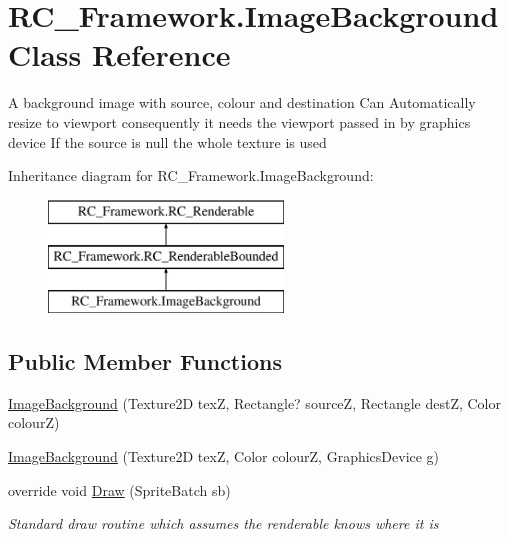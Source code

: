 \hypertarget{class_r_c___framework_1_1_image_background}{}\section{R\+C\+\_\+\+Framework.\+Image\+Background Class Reference}
\label{class_r_c___framework_1_1_image_background}


A background image with source, colour and destination Can Automatically resize to viewport consequently it needs the viewport passed in by graphics device If the source is null the whole texture is used  


Inheritance diagram for R\+C\+\_\+\+Framework.\+Image\+Background\+:\begin{figure}[H]
\begin{center}
\leavevmode
\includegraphics[height=3.000000cm]{class_r_c___framework_1_1_image_background}
\end{center}
\end{figure}
\subsection*{Public Member Functions}
\begin{DoxyCompactItemize}
\item 
\mbox{\hyperlink{class_r_c___framework_1_1_image_background_ad66973504fc9518e98e0757458973880}{Image\+Background}} (Texture2D texZ, Rectangle? sourceZ, Rectangle destZ, Color colourZ)
\item 
\mbox{\hyperlink{class_r_c___framework_1_1_image_background_a64185561061a54b6241c982541ed54a7}{Image\+Background}} (Texture2D texZ, Color colourZ, Graphics\+Device g)
\item 
override void \mbox{\hyperlink{class_r_c___framework_1_1_image_background_a1aaef38a9b320b21dc558e25d5a4c0af}{Draw}} (Sprite\+Batch sb)
\begin{DoxyCompactList}\small\item\em Standard draw routine which assumes the renderable knows where it is \end{DoxyCompactList}\end{DoxyCompactItemize}
